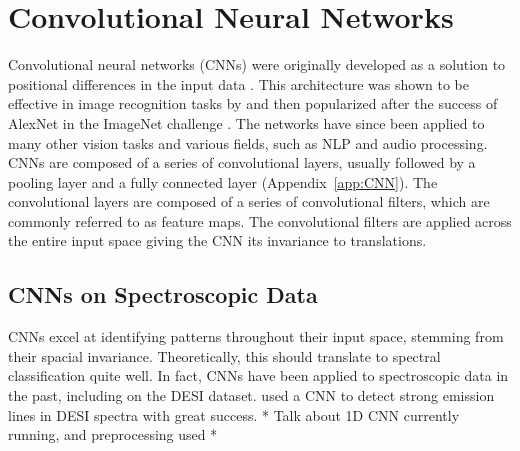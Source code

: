 \section{Convolutional Neural Networks}\label{sec:CNN}
Convolutional neural networks (CNNs) were originally developed as a solution 
to positional differences in the input data \parencite{fukushima1979}. This architecture 
was shown to be effective in image recognition tasks by \textcite{lecun2004} and then popularized after the success of AlexNet in the 
ImageNet challenge \textcite{krizhevsky2012}. The networks have since been applied to
many other vision tasks and various fields, such as NLP and audio processing. 
CNNs are composed of a series of convolutional layers, usually followed by a 
pooling layer and a fully connected layer (Appendix~\ref{app:CNN}). The convolutional layers are composed of a series of convolutional filters, which are commonly referred to as feature maps.
The convolutional filters are applied across the entire input space giving the CNN its invariance to translations.

\subsection{CNNs on Spectroscopic Data}
\label{sec:CNNspectra}
CNNs excel at identifying patterns throughout their input space, stemming from their spacial invariance. Theoretically, this should translate to spectral classification quite well. In fact, CNNs have been applied 
to spectroscopic data in the past, including on the DESI dataset. 
\textcite{parks2018} used a CNN to detect strong emission lines in DESI spectra with 
great success. * Talk about 1D CNN currently running, and preprocessing used *

